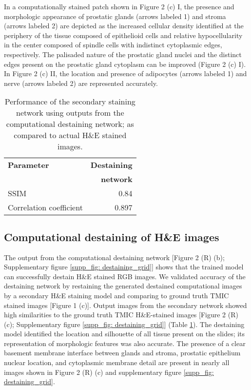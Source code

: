 \documentclass[10pt, conference, compsocconf]{IEEEtran}
\begin{document}
In a computationally stained patch shown in Figure 2 (c) I, the presence and morphologic appearance of prostatic glands (arrows labeled 1) and stroma (arrows labeled 2) are depicted as the increased cellular density identified at the periphery of the tissue composed of epithelioid cells and relative hypocellularity in the center composed of spindle cells with indistinct cytoplasmic edges, respectively. The palisaded nature of the prostatic gland nuclei and the distinct edges present on the prostatic gland cytoplasm can be improved (Figure 2 (c) I). In Figure 2 (c) II, the location and presence of adipocytes (arrows labeled 1) and nerve (arrows labeled 2) are represented accurately.

\begin{table}
    \caption{Performance of the secondary staining network using outputs from the computational destaining network; as compared to actual H\&E stained images.}
    \begin{tabular*}{\linewidth}{l @{\extracolsep{\fill}}r}
        \hline
        \textbf{Parameter} & \textbf{Destaining} \\
        & \textbf{network} \\
        \hline
        SSIM 					& 0.84 \\
        Correlation coefficient & 0.897 \\
        \hline
    \end{tabular*}
    \label{table: destaining_model_results}
\end{table}

\subsection{Computational destaining of H\&E images}
The output from the computational destaining network [Figure 2 (R) (b); Supplementary figure \ref{supp_fig: destaining_grid}] shows that the trained model can successfully destain H\&E stained RGB images. We validated accuracy of the destaining network by restaining the generated destained computational images by a secondary H\&E staining model and comparing to ground truth TMIC stained images [Figure 1 (c)]. Output images from the secondary network showed high similarities to the ground truth TMIC H\&E-stained images [Figure 2 (R) (c); Supplementary figure \ref{supp_fig: destaining_grid}] (Table \ref{table: destaining_model_results}). The destaining model identified the location and silhouette of all tissue present on the slides; its representation of morphologic features was also accurate. The presence of a clear basement membrane interface between glands and stroma, prostatic epithelium nuclear location, and cytoplasmic membrane detail are present in nearly all images shown in Figure 2 (R) (c) and supplementary figure \ref{supp_fig: destaining_grid}.
\end{document}
